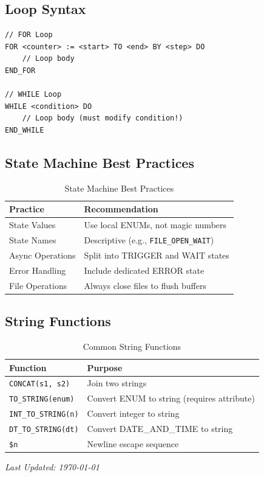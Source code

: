 \documentclass[11pt,a4paper]{article}
\begin{document}
\subsection*{Loop Syntax}

\begin{lstlisting}
// FOR Loop
FOR <counter> := <start> TO <end> BY <step> DO
    // Loop body
END_FOR

// WHILE Loop
WHILE <condition> DO
    // Loop body (must modify condition!)
END_WHILE
\end{lstlisting}

\subsection*{State Machine Best Practices}

\begin{table}[h]
\centering
\begin{tabular}{@{}ll@{}}
\toprule
\textbf{Practice} & \textbf{Recommendation} \\
\midrule
State Values & Use local ENUMs, not magic numbers \\
State Names & Descriptive (e.g., \texttt{FILE\_OPEN\_WAIT}) \\
Async Operations & Split into TRIGGER and WAIT states \\
Error Handling & Include dedicated ERROR state \\
File Operations & Always close files to flush buffers \\
\bottomrule
\end{tabular}
\caption{State Machine Best Practices}
\end{table}

\subsection*{String Functions}

\begin{table}[h]
\centering
\begin{tabular}{@{}ll@{}}
\toprule
\textbf{Function} & \textbf{Purpose} \\
\midrule
\texttt{CONCAT(s1, s2)} & Join two strings \\
\texttt{TO\_STRING(enum)} & Convert ENUM to string (requires attribute) \\
\texttt{INT\_TO\_STRING(n)} & Convert integer to string \\
\texttt{DT\_TO\_STRING(dt)} & Convert DATE\_AND\_TIME to string \\
\texttt{\$n} & Newline escape sequence \\
\bottomrule
\end{tabular}
\caption{Common String Functions}
\end{table}

\vfill

\begin{center}
\textit{Last Updated: \today}
\end{center}
\end{document}
